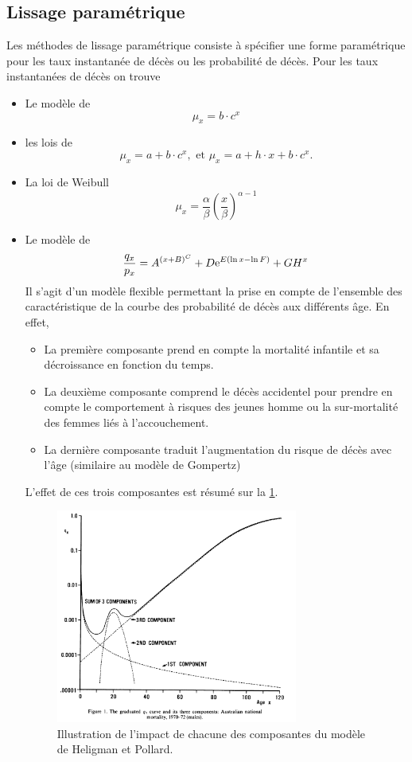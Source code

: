 \subsection{Lissage paramétrique}
Les méthodes de lissage paramétrique consiste à spécifier une forme paramétrique pour les taux instantanée de décès ou les probabilité de décès. Pour les taux instantanées de décès on trouve
\begin{itemize}
\item Le modèle de \citet{1825}
$$
\mu_x = b\cdot c^x
$$
\item les lois de \citet{Makeham1860}
$$
\mu_x =a+ b\cdot c^x,\text{ et }\mu_x =a + h\cdot x+ b\cdot c^x.
$$
\item La loi de Weibull
$$
\mu_x =\frac{\alpha}{\beta}\left(\frac{x}{\beta}\right)^{\alpha - 1} 
$$
\item Le modèle de \citet{Heligman1980}
$$
\frac{q_x}{p_x} = A^{(x+B)^C}+D\mathrm{e}^{E(\ln x - \ln F)}+GH^x
$$
Il s'agit d'un modèle flexible permettant la prise en compte de l'ensemble des caractéristique de la courbe des probabilité de décès aux différents âge. En effet,
\begin{itemize}
  \item La première composante prend en compte la mortalité infantile et sa décroissance en fonction du temps.
  \item La deuxième composante comprend le décès accidentel pour prendre en compte le comportement à risques des jeunes homme ou la sur-mortalité des femmes liés à l'accouchement. 
  \item La dernière composante traduit l'augmentation du risque de décès avec l'âge (similaire au modèle de Gompertz)
\end{itemize}
L'effet de ces trois composantes est résumé sur la \cref{fig:Helgman_pollard_model}.
\begin{figure}[h!]
\centering
\includegraphics[width = 0.75\textwidth]{../figures/Helgman_pollard_model.png}
\caption{Illustration de l'impact de chacune des composantes du modèle de Heligman et Pollard.}
\label{fig:Helgman_pollard_model}
\end{figure}
\end{itemize}
